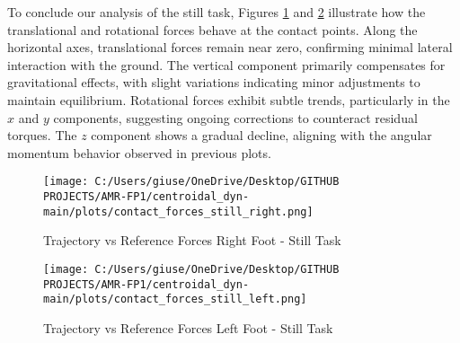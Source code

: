 \documentclass[main.tex]{subfiles}
\begin{document}
\begin{sloppypar}
To conclude our analysis of the still task, Figures \ref{fig:contact_forces_still_right} and \ref{fig:contact_forces_still_left} illustrate how the translational and rotational forces behave at the contact points. Along the horizontal axes, translational forces remain near zero, confirming minimal lateral interaction with the ground. The vertical component primarily compensates for gravitational effects, with slight variations indicating minor adjustments to maintain equilibrium. Rotational forces exhibit subtle trends, particularly in the \( x \) and \( y \) components, suggesting ongoing corrections to counteract residual torques. The \( z \) component shows a gradual decline, aligning with the angular momentum behavior observed in previous plots.
\begin{figure}[htbp]
    \centering
    \texttt{[image: C:/Users/giuse/OneDrive/Desktop/GITHUB PROJECTS/AMR-FP1/centroidal\_dyn-main/plots/contact\_forces\_still\_right.png]}
    \caption{Trajectory vs Reference Forces Right Foot - Still Task}
    \label{fig:contact_forces_still_right}
\end{figure}
\begin{figure}[htbp]
    \centering
    \texttt{[image: C:/Users/giuse/OneDrive/Desktop/GITHUB PROJECTS/AMR-FP1/centroidal\_dyn-main/plots/contact\_forces\_still\_left.png]}
    \caption{Trajectory vs Reference Forces Left Foot - Still Task}
    \label{fig:contact_forces_still_left}
\end{figure}
\newpage

\end{sloppypar}
\end{document}
